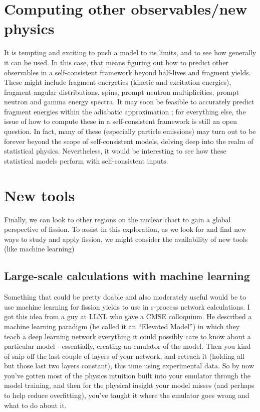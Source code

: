 

\section{Computing other observables/new physics}
It is tempting and exciting to push a model to its limits, and to see how generally it can be used. In this case, that means figuring out how to predict other observables in a self-consistent framework beyond half-lives and fragment yields. These might include fragment energetics (kinetic and excitation energies), fragment angular distributions, spins, prompt neutron multiplicities, prompt neutron and gamma energy spectra. It may soon be feasible to accurately predict fragment energies within the adiabatic approximation \cite{Younes2011}; for everything else, the issue of how to compute these in a self-consistent framework is still an open question. In fact, many of these (especially particle emissions) may turn out to be forever beyond the scope of self-consistent models, delving deep into the realm of statistical physics. Nevertheless, it would be interesting to see how these statistical models perform with self-consistent inputs.



\section{New tools}
Finally, we can look to other regions on the nuclear chart to gain a global perspective of fission. To assist in this exploration, as we look for and find new ways to study and apply fission, we might consider the availability of new tools (like machine learning)

\subsection{Large-scale calculations with machine learning}
Something that could be pretty doable and also moderately useful would be to use machine learning for fission yields to use in r-process network calculations. I got this idea from a guy at LLNL who gave a CMSE colloquium. He described a machine learning paradigm (he called it an ``Elevated Model'') in which they teach a deep learning network everything it could possibly care to know about a particular model - essentially, creating an emulator of the model. Then you kind of snip off the last couple of layers of your network, and reteach it (holding all but those last two layers constant), this time using experimental data. So by now you've gotten most of the physics intuition built into your emulator through the model training, and then for the physical insight your model misses (and perhaps to help reduce overfitting), you've taught it where the emulator goes wrong and what to do about it.


